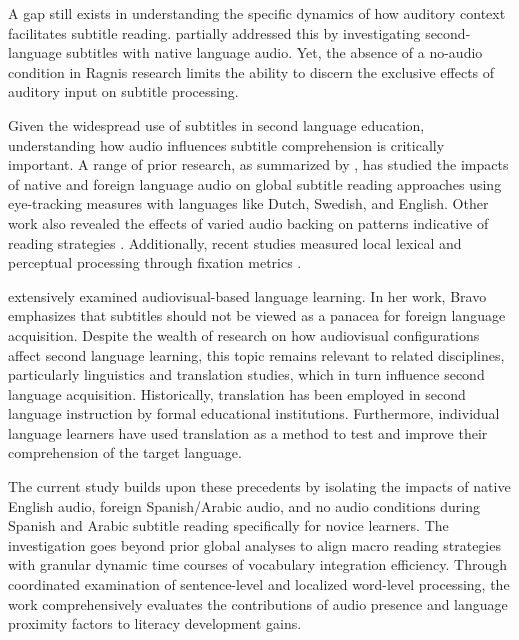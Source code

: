 A gap still exists in understanding the specific dynamics of how
auditory context facilitates subtitle reading. \textcite{ragni2020} partially
addressed this by investigating second-language subtitles with native
language audio. Yet, the absence of a no-audio condition in
Ragni\textquotesingle s research limits the ability to discern the
exclusive effects of auditory input on subtitle processing.

Given the widespread use of subtitles in second language education,
understanding how audio influences subtitle comprehension is critically
important. A range of prior research, as summarized by \textcite{liao2022}, has studied the impacts of native and foreign language audio on
global subtitle reading approaches using eye-tracking measures with
languages like Dutch, Swedish, and English. Other work also revealed the
effects of varied audio backing on patterns indicative of reading
strategies \cite{szarkowska2018}. Additionally, recent
studies measured local lexical and perceptual processing through
fixation metrics \cite{bisson2014,ragni2020}.

\textcite{bravo2008} extensively examined audiovisual-based language
learning. In her work, Bravo emphasizes that subtitles should not be
viewed as a panacea for foreign language acquisition. Despite the
wealth of research on how audiovisual configurations affect second
language learning, this topic remains relevant to related disciplines,
particularly linguistics and translation studies, which in turn
influence second language acquisition. Historically, translation has
been employed in second language instruction by formal educational
institutions. Furthermore, individual language learners have used
translation as a method to test and improve their comprehension of the
target language.

The current study builds upon these precedents by isolating the impacts
of native English audio, foreign Spanish/Arabic audio, and no audio
conditions during Spanish and Arabic subtitle reading specifically for
novice learners. The investigation goes beyond prior global analyses to
align macro reading strategies with granular dynamic time courses of
vocabulary integration efficiency. Through coordinated examination of
sentence-level and localized word-level processing, the work
comprehensively evaluates the contributions of audio presence and
language proximity factors to literacy development gains.

